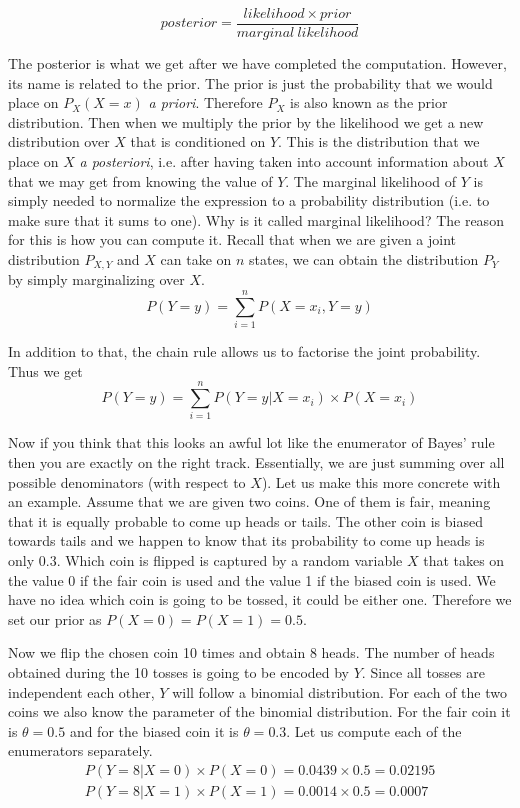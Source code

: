 $$ posterior = \dfrac{likelihood \times prior}{marginal~likelihood} $$

The posterior is what we get after we have completed the computation. However, its name is related to the prior.
The prior is just the probability that we would place on $ P_{X}(X=x) $ \textit{a priori}. Therefore $ P_{X} $
is also known as the prior distribution. Then when we multiply the prior by the likelihood we get a new distribution
over $ X $ that is conditioned on $ Y $. This is the distribution that we place on $ X $ \textit{a posteriori}, i.e.
after having taken into account information about $ X $ that we may get from knowing the value of $ Y $. The marginal
likelihood of $ Y $ is simply needed to normalize the expression to a probability distribution (i.e. to make sure that
it sums to one). Why is it called marginal likelihood? The reason for this is how you can compute it. Recall that when
we are given a joint distribution $ P_{X,Y} $ and $ X $ can take on $ n $ states, we can obtain the distribution
$ P_{Y} $ by simply marginalizing over $ X $.
\begin{equation}
P(Y=y) = \underset{i=1}{\overset{n}{\sum}}P(X=x_{i}, Y=y)
\end{equation}

In addition to that, the chain rule allows us to factorise the joint probability. Thus we get
\begin{equation}
P(Y=y) = \underset{i=1}{\overset{n}{\sum}}P(Y=y|X=x_{i}) \times P(X=x_{i})
\end{equation}

Now if you think that this looks an awful lot like the enumerator of Bayes' rule then you are exactly on the right track.
Essentially, we are just summing over all possible denominators (with respect to $ X $). Let us make this more
concrete with an example. Assume that we are given two coins. One of them is fair, meaning that it is equally probable
to come up heads or tails. The other coin is biased towards tails and we happen to know that its probability to come up
heads is only $ 0.3 $. Which coin is flipped is captured by a random variable $ X $ that takes on the value 0 if the
fair coin is used and the value 1 if the biased coin is used. We have no idea which coin is going to be tossed, it could
be either one. Therefore we set our prior as $ P(X=0) = P(X=1) = 0.5 $.

Now we flip the chosen coin 10 times and obtain 8 heads. The number of heads obtained during the 10 tosses is going
to be encoded by $ Y $. Since all tosses are independent each other, $ Y $ will
follow a binomial distribution. For each of the two coins we also know the parameter of the binomial distribution.
For the fair coin it is $ \theta = 0.5 $ and for the biased coin it is $ \theta = 0.3 $. Let us compute each of the
enumerators separately.
\begin{align}
P(Y=8|X=0) \times P(X=0) = 0.0439 \times 0.5 = 0.02195 \label{bayes1} \\ 
P(Y=8|X=1) \times P(X=1) = 0.0014 \times 0.5 = 0.0007 \label{bayes2}
\end{align}

